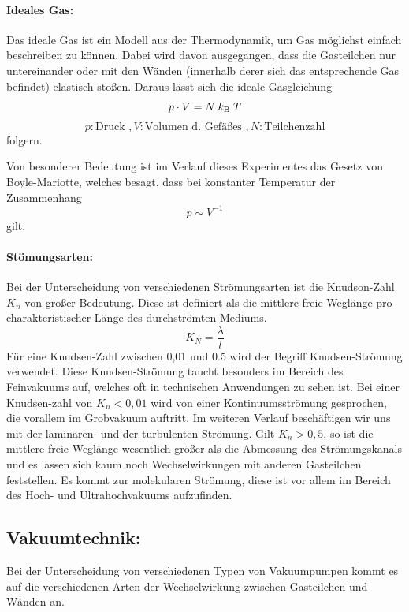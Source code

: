 \paragraph{Ideales Gas:}
Das ideale Gas ist ein Modell aus der Thermodynamik, um Gas möglichst einfach beschreiben zu
können. Dabei wird davon ausgegangen, dass die Gasteilchen nur untereinander oder mit den Wänden
(innerhalb derer sich das entsprechende Gas befindet) elastisch stoßen. Daraus lässt sich die ideale Gasgleichung
\begin{equation}
  p \cdot V = N \;k_\text{B}\;T \\
  \label{eqn:ideal}
\end{equation}
\begin{equation*}
  p:\text{Druck }, V:\text{Volumen d. Gefäßes }, N:\text{Teilchenzahl}
\end{equation*}
folgern.

Von besonderer Bedeutung ist im Verlauf dieses Experimentes das Gesetz von Boyle-Mariotte, welches besagt,
dass bei konstanter Temperatur der Zusammenhang
\begin{equation}
  p \sim V^{-1}
\end{equation}
gilt.

\paragraph{Stömungsarten:}
Bei der Unterscheidung von verschiedenen Strömungsarten ist die Knudson-Zahl $K_n$ von großer
Bedeutung. Diese ist definiert als die mittlere freie Weglänge pro charakteristischer Länge des
durchströmten Mediums.
\begin{equation}
  K_N = \frac{\lambda}{l}
  \label{eqn:Knudsen}
\end{equation}
Für eine Knudsen-Zahl zwischen 0,01 und 0.5 wird der Begriff Knudsen-Strömung verwendet. Diese
Knudsen-Strömung taucht besonders im Bereich des Feinvakuums auf, welches oft in technischen Anwendungen
zu sehen ist.
Bei einer Knudsen-zahl von $K_n < 0,01$ wird von einer Kontinuumsströmung gesprochen, die vorallem im
Grobvakuum auftritt. Im weiteren Verlauf beschäftigen wir uns mit der laminaren- und der turbulenten Strömung.
Gilt $K_n > 0,5$, so ist die mittlere freie Weglänge wesentlich größer als die Abmessung des Strömungskanals
und es lassen sich kaum noch Wechselwirkungen mit anderen Gasteilchen feststellen. Es kommt zur molekularen
Strömung, diese ist vor allem im Bereich des Hoch- und Ultrahochvakuums aufzufinden.

\subsection{Vakuumtechnik:}
Bei der Unterscheidung von verschiedenen Typen von Vakuumpumpen kommt es auf die verschiedenen Arten der
Wechselwirkung zwischen Gasteilchen und Wänden an.

